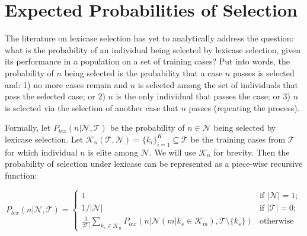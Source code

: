 \documentclass[twoside]{article}
\begin{document}
\section{Expected Probabilities of Selection}\label{s:prob}
The literature on lexicase selection has yet to analytically address the question: what is the probability of an individual being selected by lexicase selection, given its performance in a population on a set of training cases?  Put into words, the probability of $n$ being selected is the probability that a case $n$ passes is selected and: 1) no more cases remain and $n$ is selected among the set of individuals that pass the selected case; or 2) $n$ is the only individual that passes the case; or 3) $n$ is selected via the selection of another case that $n$ passes (repeating the process). 

Formally, let $P_{lex}(n | \mathcal{N}, \mathcal{T})$ be the probability of $n \in \mathcal{N}$ being selected by lexicase selection. Let $\mathcal{K}_n(\mathcal{T},\mathcal{N}) = \{k_i\}_{i=1}^K \subseteq \mathcal{T}$ be the training cases from $\mathcal{T}$ for which individual $n$ is elite among $\mathcal{N}$. We will use $\mathcal{K}_n$ for brevity. Then the probability of selection under lexicase can be represented as a piece-wise recursive function: 



\begin{equation}\label{eq:prob}
P_{lex}(n | \mathcal{N}, \mathcal{T}) =
\begin{cases}
1 & \text{if } |\mathcal{N}| = 1;\\
1/|\mathcal{N}| & \text{if } |\mathcal{T}| = 0;\\
\frac{1}{|\mathcal{T}|}\sum_{k_s \in \mathcal{K}_n}{P_{lex} \left( n | \mathcal{N}(m|k_s \in \mathcal{K}_m), \mathcal{T} \setminus \{k_s\} \right)} & \text{otherwise}
\end{cases}
\end{equation}
\end{document}
